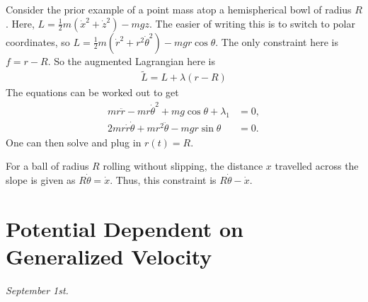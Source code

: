 \begin{example}
    Consider the prior example of a point mass atop a hemispherical bowl of radius $R$. Here, $L = \frac{1}{2}m(\dot{x}^{2}+\dot{z}^{2}) - mgz$. The easier of writing this is to switch to polar coordinates, so $L = \frac{1}{2}m(\dot{r}^{2}+r^{2}\dot{\theta}^{2}) - mgr \cos \theta$. The only constraint here is $f = r - R$. So the augmented Lagrangian here is
    \begin{align}
        \tilde{L} = L + \lambda(r-R)
    \end{align}
    The equations can be worked out to get
    \begin{align}
        mr\ddot{r}-mr\dot{\theta}^{2} + mg\cos\theta + \lambda_{1} &= 0,\\
        2mr\dot{r}\dot{\theta} + mr^{2}\ddot{\theta} - mgr\sin\theta &= 0.
    \end{align}
    One can then solve and plug in $r(t) = R$.
\end{example}

\begin{example}
    For a ball of radius $R$ rolling without slipping, the distance $x$ travelled across the slope is given as $R\dot{\theta} = \dot{x}$. Thus, this constraint is $R\dot{\theta} - \dot{x}$.
\end{example}

\section{Potential Dependent on Generalized Velocity}
\textit{September 1st.}

